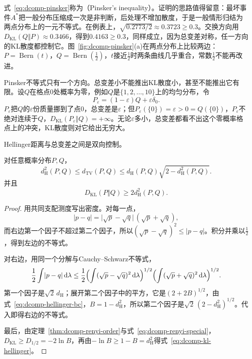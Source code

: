 式~\eqref{eq:dcomp-pinsker}称为（Pinsker's inequality）。证明的思路值得留意：最坏事件$A^{*}$把一般分布压缩成一次是非判断，后处理不增加散度，于是一般情形归结为两点分布上的一元不等式。在例表上，$\sqrt{0.2773/2}\approx0.3723\geq0.3$。交换方向用$D_{\mathrm{KL}}(Q\Vert P)\approx0.3466$，得到$0.4163\geq0.3$，同样成立，因为总变差对称，任一方向的KL散度都控制它。图~\ref{fig:dcomp-pinsker}(a)在两点分布上比较两边：$P=\operatorname{Bern}(t)$，$Q=\operatorname{Bern}(\tfrac12)$，$t$接近$\tfrac12$时两条曲线几乎重合，常数$\tfrac12$不能再改进。

Pinsker不等式只有一个方向。总变差小不能推出KL散度小，甚至不能推出它有限。设$Q$在格点$0$处概率为零，例如$Q$是$\{1,2,\dots,10\}$上的均匀分布，令
\[
 P_\varepsilon=(1-\varepsilon)Q+\varepsilon\delta_0 .
\]
$P_\varepsilon$把$Q$的$\varepsilon$份质量挪到了点$0$，总变差是$\varepsilon$；但$P_\varepsilon(\{0\})=\varepsilon>0=Q(\{0\})$，$P_\varepsilon$不绝对连续于$Q$，$D_{\mathrm{KL}}(P_\varepsilon\Vert Q)=+\infty$。无论$\varepsilon$多小，总变差都看不出这个零概率格点上的冲突，KL散度则对它给出无穷大。

Hellinger距离与总变差之间是双向控制。

\begin{theorem}[Hellinger距离与总变差]
\label{thm:dcomp-hellinger-tv}
对任意概率分布$P,Q$，
\begin{equation}
 d_{\mathrm{H}}^{2}(P,Q)\leq d_{\mathrm{TV}}(P,Q)\leq d_{\mathrm{H}}(P,Q)\sqrt{2-d_{\mathrm{H}}^{2}(P,Q)} .
 \label{eq:dcomp-hellinger-tv}
\end{equation}
并且
\begin{equation}
 D_{\mathrm{KL}}(P\Vert Q)\geq2d_{\mathrm{H}}^{2}(P,Q) .
 \label{eq:dcomp-kl-hellinger}
\end{equation}
\end{theorem}

\begin{proof}
用共同支配测度写出密度。对每一点，
\[
 \lvert p-q\rvert=\lvert\sqrt{p}-\sqrt{q}\rvert\,(\sqrt{p}+\sqrt{q}),
\]
而右边第一个因子不超过第二个因子，所以$(\sqrt{p}-\sqrt{q})^{2}\leq\lvert p-q\rvert$。积分并乘以$\tfrac12$，得到左边的不等式。

对右边，用同一个分解与Cauchy--Schwarz不等式，
\[
 \frac12\int\lvert p-q\rvert\,\mathrm{d}\lambda\leq\frac12\Bigl(\int(\sqrt{p}-\sqrt{q})^{2}\,\mathrm{d}\lambda\Bigr)^{1/2}\Bigl(\int(\sqrt{p}+\sqrt{q})^{2}\,\mathrm{d}\lambda\Bigr)^{1/2} .
\]
第一个因子是$\sqrt2\,d_{\mathrm{H}}$；展开第二个因子中的平方，它是$(2+2B)^{1/2}$，由式~\eqref{eq:dcomp-hellinger-bc}，$B=1-d_{\mathrm{H}}^{2}$，所以第二个因子是$\sqrt2\,(2-d_{\mathrm{H}}^{2})^{1/2}$。代入即得右边的不等式。

最后，由定理~\ref{thm:dcomp-renyi-order}与式~\eqref{eq:dcomp-renyi-special}，$D_{\mathrm{KL}}\geq D_{1/2}=-2\ln B$，再由$-\ln B\geq1-B=d_{\mathrm{H}}^{2}$得式~\eqref{eq:dcomp-kl-hellinger}。
\end{proof}

